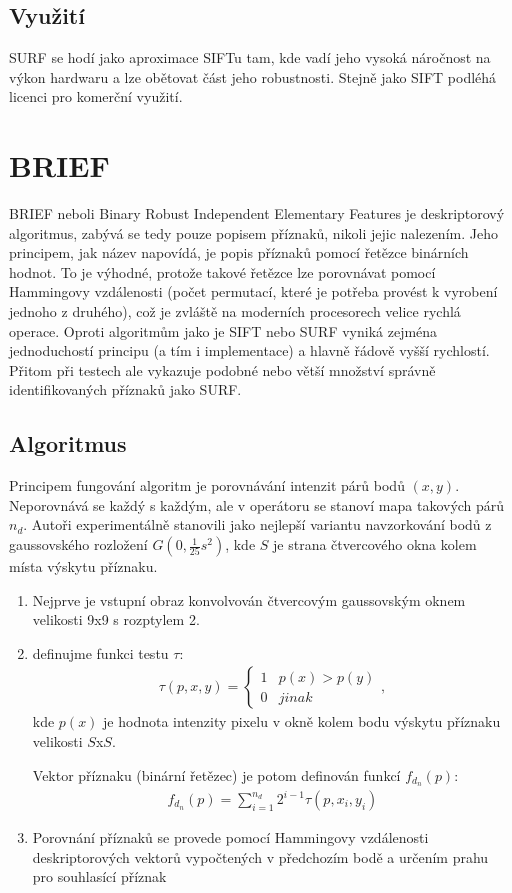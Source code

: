 	\subsection{Využití}
	
		SURF se hodí jako aproximace SIFTu tam, kde vadí jeho vysoká náročnost na výkon hardwaru a lze obětovat část jeho robustnosti. Stejně jako SIFT podléhá licenci pro komerční využití.

\section{BRIEF}

	BRIEF neboli Binary Robust Independent Elementary Features je deskriptorový algoritmus, zabývá se tedy pouze popisem příznaků, nikoli jejic nalezením. Jeho principem, jak název napovídá, je popis příznaků pomocí řetězce binárních hodnot. To je výhodné, protože takové řetězce lze porovnávat pomocí Hammingovy vzdálenosti (počet permutací, které je potřeba provést k vyrobení jednoho z druhého), což je zvláště na moderních procesorech velice rychlá operace. Oproti algoritmům jako je SIFT nebo SURF vyniká zejména jednoduchostí principu (a tím i implementace) a hlavně řádově vyšší rychlostí. Přitom při testech ale vykazuje podobné nebo větší množství správně identifikovaných příznaků jako SURF.
	
	\subsection{Algoritmus}
		
		Principem fungování algoritm je porovnávání intenzit párů bodů $(x,y)$. Neporovnává se každý s každým, ale v operátoru se stanoví mapa takových párů $n_d$. Autoři experimentálně stanovili jako nejlepší variantu navzorkování bodů z gaussovského rozložení $G(0, \frac{1}{25}s^2)$, kde $S$ je strana čtvercového okna kolem místa výskytu příznaku.
		
		\begin{enumerate}
		\item Nejprve je vstupní obraz konvolvován čtvercovým gaussovským oknem velikosti 9x9 s rozptylem 2.
		\item definujme funkci testu $\tau$:
			\begin{align}
			\tau(p,x,y) = 
			\begin{cases}
			1 & p(x)>p(y) \\
			0 & jinak
			\end{cases}, 
			\end{align}
		kde $p(x)$ je hodnota intenzity pixelu v okně kolem bodu výskytu příznaku velikosti $S$x$S$. 
		
		Vektor příznaku (binární řetězec) je potom definován funkcí $f_{d_n}(p)$:
		\begin{align}
		f_{d_n}(p) = \sum_{i=1}^{n_d} 2^{i-1} \tau(p, x_i, y_i)
		\end{align}
		\item Porovnání příznaků se provede pomocí Hammingovy vzdálenosti deskriptorových vektorů vypočtených v předchozím bodě a určením prahu pro souhlasící příznak
		\end{enumerate}
	
